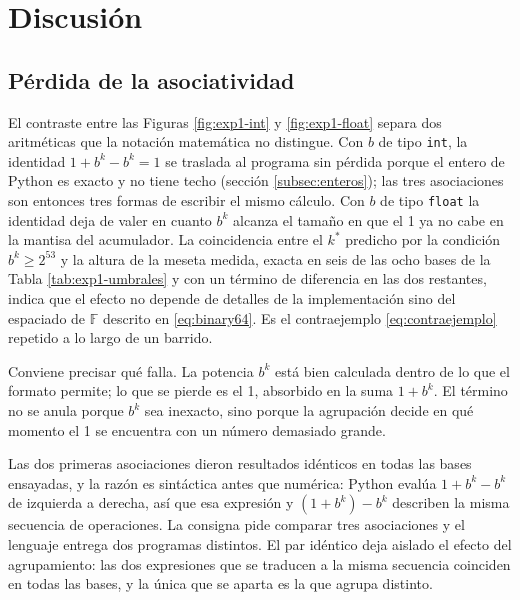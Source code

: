 \section{Discusión}
\label{sec:discusion}

\subsection{Pérdida de la asociatividad}
\label{subsec:dis-asociatividad}

El contraste entre las Figuras \ref{fig:exp1-int} y \ref{fig:exp1-float} separa dos aritméticas que
la notación matemática no distingue. Con $b$ de tipo \texttt{int}, la identidad $1 + b^{k} - b^{k} = 1$
se traslada al programa sin pérdida porque el entero de Python es exacto y no tiene techo
(sección \ref{subsec:enteros}); las tres asociaciones son entonces tres formas de escribir el mismo
cálculo. Con $b$ de tipo \texttt{float} la identidad deja de valer en cuanto $b^{k}$ alcanza el
tamaño en que el 1 ya no cabe en la mantisa del acumulador. La coincidencia entre el $k^{\ast}$
predicho por la condición $b^{k} \ge 2^{53}$ y la altura de la meseta medida, exacta en seis de las
ocho bases de la Tabla \ref{tab:exp1-umbrales} y con un término de diferencia en las dos restantes,
indica que el efecto no depende de detalles de la implementación
sino del espaciado de $\mathbb{F}$ descrito en \eqref{eq:binary64}. Es el contraejemplo
\eqref{eq:contraejemplo} repetido a lo largo de un barrido.

Conviene precisar qué falla. La potencia $b^{k}$ está bien calculada dentro de lo que el formato
permite; lo que se pierde es el 1, absorbido en la suma $1 + b^{k}$. El término no se anula porque
$b^{k}$ sea inexacto, sino porque la agrupación decide en qué momento el 1 se encuentra con un
número demasiado grande.

Las dos primeras asociaciones dieron resultados idénticos en todas las bases ensayadas, y la razón
es sintáctica antes que numérica: Python evalúa $1 + b^{k} - b^{k}$ de izquierda a derecha, así que
esa expresión y $(1 + b^{k}) - b^{k}$ describen la misma secuencia de operaciones. La consigna pide
comparar tres asociaciones y el lenguaje entrega dos programas distintos. El par idéntico deja
aislado el efecto del agrupamiento: las dos expresiones que se traducen a la misma secuencia
coinciden en todas las bases, y la única que se aparta es la que agrupa distinto.

